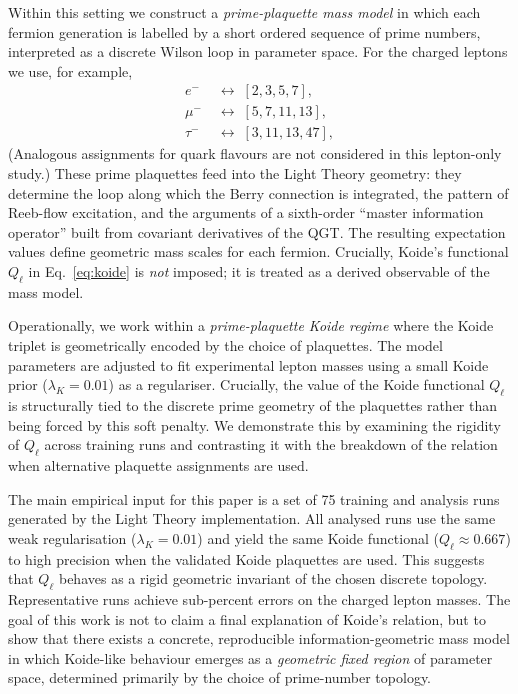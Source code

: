\documentclass[12pt]{article}
\begin{document}
Within this setting we construct a \emph{prime-plaquette mass model}
in which each fermion generation is labelled by a short ordered sequence
of prime numbers, interpreted as a discrete Wilson loop in parameter
space.  For the charged leptons we use, for example,
%
\begin{align}
  e^- &\;\leftrightarrow\; [2,3,5,7], \\
  \mu^- &\;\leftrightarrow\; [5,7,11,13], \\
  \tau^- &\;\leftrightarrow\; [3,11,13,47],
\end{align}
%
(Analogous assignments for quark flavours are not considered in this lepton-only study.)
These prime plaquettes feed into the Light Theory geometry:
they determine the loop along which the Berry connection is integrated,
the pattern of Reeb-flow excitation, and the arguments of a sixth-order
``master information operator'' built from covariant derivatives of the
QGT.  The resulting expectation values define geometric mass scales
for each fermion.  Crucially, Koide's functional $Q_\ell$ in
Eq.~\eqref{eq:koide} is \emph{not} imposed; it is treated as a
derived observable of the mass model.

Operationally, we work within a \emph{prime-plaquette Koide regime} where
the Koide triplet is geometrically encoded by the choice of plaquettes.
The model parameters are adjusted to fit experimental lepton masses using a small Koide prior ($\lambda_K = 0.01$)
as a regulariser.  Crucially, the value of the Koide functional $Q_\ell$
is structurally tied to the discrete prime geometry of the plaquettes
rather than being forced by this soft penalty.  We demonstrate this by
examining the rigidity of $Q_\ell$ across training runs and contrasting
it with the breakdown of the relation when alternative plaquette
assignments are used.

The main empirical input for this paper is a set of 75 training and
analysis runs generated by the Light Theory implementation.
All analysed runs use the same weak regularisation ($\lambda_K = 0.01$)
and yield the same Koide functional ($Q_\ell \approx 0.667$) to high
precision when the validated Koide plaquettes are used.
This suggests that $Q_\ell$ behaves as a rigid geometric invariant of
the chosen discrete topology.
Representative runs achieve sub-percent errors on the charged lepton masses.
The goal of this work is not to claim a final explanation of Koide's
relation, but to show that there exists a concrete, reproducible
information-geometric mass model in which Koide-like behaviour emerges
as a \emph{geometric fixed region} of parameter space, determined
primarily by the choice of prime-number topology.
\end{document}
